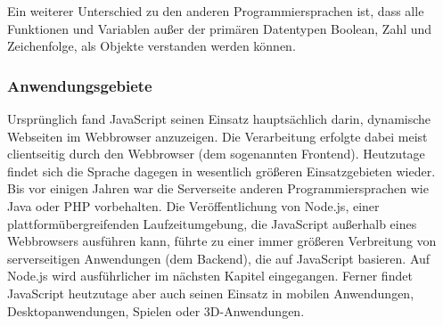 Ein weiterer Unterschied zu den anderen Programmiersprachen ist, dass alle Funktionen und Variablen außer der primären Datentypen Boolean, Zahl und Zeichenfolge, als Objekte verstanden werden können.

\subsubsection{Anwendungsgebiete}
Ursprünglich fand JavaScript seinen Einsatz hauptsächlich darin, dynamische Webseiten im Web\-browser anzuzeigen. Die Verarbeitung erfolgte dabei meist clientseitig durch den Webbrowser (dem sogenannten Frontend)\cite{JS1.3}.
\newline
\noindent
Heutzutage findet sich die Sprache dagegen in wesentlich größeren Einsatzgebieten wieder. 
Bis vor einigen Jahren war die Serverseite anderen Programmiersprachen wie Java oder PHP vorbehalten. Die Veröffentlichung von Node.js, einer plattformübergreifenden Laufzeitumgebung, die JavaScript außerhalb eines Webbrowsers ausführen kann, führte zu einer immer größeren Verbreitung von serverseitigen Anwendungen (dem Backend), die auf JavaScript basieren. Auf Node.js wird ausführlicher im nächsten Kapitel eingegangen. 
Ferner findet JavaScript heutzutage aber auch seinen Einsatz in mobilen Anwendungen, Desktopanwendungen, Spielen oder 3D-Anwendungen. \cite{JS1.4}

